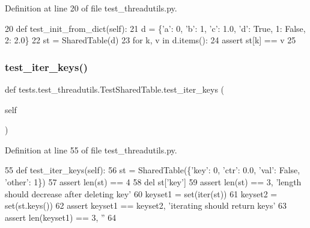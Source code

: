 Definition at line 20 of file test\+\_\+threadutils.\+py.


\begin{DoxyCode}
20     \textcolor{keyword}{def }test\_init\_from\_dict(self):
21         d = \{\textcolor{stringliteral}{'a'}: 0, \textcolor{stringliteral}{'b'}: 1, \textcolor{stringliteral}{'c'}: 1.0, \textcolor{stringliteral}{'d'}: \textcolor{keyword}{True}, 1: \textcolor{keyword}{False}, 2: 2.0\}
22         st = SharedTable(d)
23         \textcolor{keywordflow}{for} k, v \textcolor{keywordflow}{in} d.items():
24             \textcolor{keyword}{assert} st[k] == v
25 
\end{DoxyCode}
\mbox{\label{classtests_1_1test__threadutils_1_1TestSharedTable_ad83a5fe7bed1811264f41406c3ec8976}} 
\subsubsection{\texorpdfstring{test\+\_\+iter\+\_\+keys()}{test\_iter\_keys()}}
{\footnotesize\ttfamily def tests.\+test\+\_\+threadutils.\+Test\+Shared\+Table.\+test\+\_\+iter\+\_\+keys (\begin{DoxyParamCaption}\item[{}]{self }\end{DoxyParamCaption})}



Definition at line 55 of file test\+\_\+threadutils.\+py.


\begin{DoxyCode}
55     \textcolor{keyword}{def }test\_iter\_keys(self):
56         st = SharedTable(\{\textcolor{stringliteral}{'key'}: 0, \textcolor{stringliteral}{'ctr'}: 0.0, \textcolor{stringliteral}{'val'}: \textcolor{keyword}{False}, \textcolor{stringliteral}{'other'}: 1\})
57         \textcolor{keyword}{assert} len(st) == 4
58         del st[\textcolor{stringliteral}{'key'}]
59         \textcolor{keyword}{assert} len(st) == 3, \textcolor{stringliteral}{'length should decrease after deleting key'}
60         keyset1 = set(iter(st))
61         keyset2 = set(st.keys())
62         \textcolor{keyword}{assert} keyset1 == keyset2, \textcolor{stringliteral}{'iterating should return keys'}
63         \textcolor{keyword}{assert} len(keyset1) == 3, \textcolor{stringliteral}{''}
64 
\end{DoxyCode}
\mbox{\label{classtests_1_1test__threadutils_1_1TestSharedTable_a44071985cd8526645fb0f2c41fddbff9}} 

